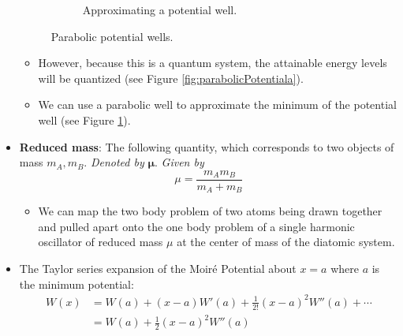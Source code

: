 \documentclass[../notes.tex]{subfiles}
\begin{document}
\begin{itemize}
\begin{figure}[h!]
\begin{subfigure}[b]{0.4\linewidth}
            \caption{Approximating a potential well.}
            \label{fig:parabolicPotentialb}
        \end{subfigure}
        \caption{Parabolic potential wells.}
        \label{fig:parabolicPotential}
    \end{figure}
    \begin{itemize}
        \item However, because this is a quantum system, the attainable energy levels will be quantized (see Figure \ref{fig:parabolicPotentiala}).
        \item We can use a parabolic well to approximate the minimum of the potential well (see Figure \ref{fig:parabolicPotentialb}).
    \end{itemize}
    \item \textbf{Reduced mass}: The following quantity, which corresponds to two objects of mass $m_A,m_B$. \emph{Denoted by} $\bm{\mu}$. \emph{Given by}
    \begin{equation*}
        \mu = \frac{m_Am_B}{m_A+m_B}
    \end{equation*}
    \begin{itemize}
        \item We can map the two body problem of two atoms being drawn together and pulled apart onto the one body problem of a single harmonic oscillator of reduced mass $\mu$ at the center of mass of the diatomic system.
    \end{itemize}
    \item The Taylor series expansion of the Moir\'{e} Potential about $x=a$ where $a$ is the minimum potential:
    \begin{align*}
        W(x) &= W(a)+(x-a)W'(a)+\frac{1}{2!}(x-a)^2W''(a)+\cdots\\
        &= W(a)+\frac{1}{2}(x-a)^2W''(a)\\

\end{align*}
\end{itemize}
\end{document}
